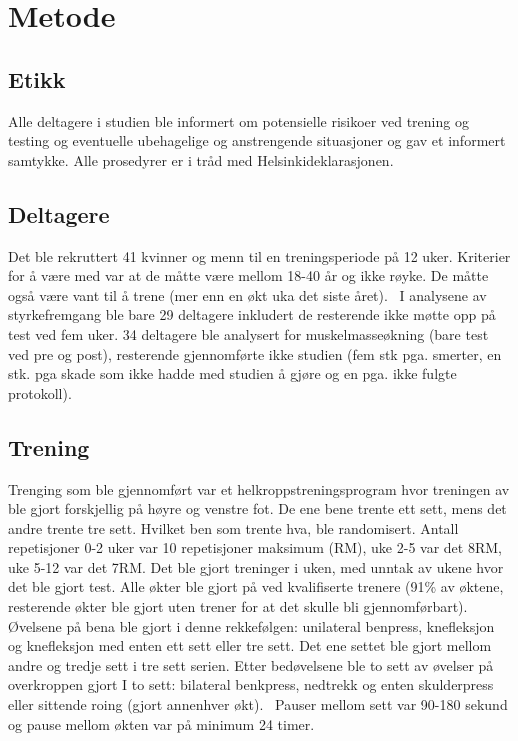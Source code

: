 \documentclass[
]{book}
\begin{document}
\hypertarget{metode-2}{%
\section{Metode}\label{metode-2}}

\hypertarget{etikk}{%
\subsection{Etikk}\label{etikk}}

Alle deltagere i studien ble informert om potensielle risikoer ved trening og testing og eventuelle ubehagelige og anstrengende situasjoner og gav et informert samtykke. Alle prosedyrer er i tråd med Helsinkideklarasjonen.

\hypertarget{deltagere}{%
\subsection{Deltagere}\label{deltagere}}

Det ble rekruttert 41 kvinner og menn til en treningsperiode på 12 uker. Kriterier for å være med var at de måtte være mellom 18-40 år og ikke røyke. De måtte også være vant til å trene (mer enn en økt uka det siste året). ~I analysene av styrkefremgang ble bare 29 deltagere inkludert de resterende ikke møtte opp på test ved fem uker. 34 deltagere ble analysert for muskelmasseøkning (bare test ved pre og post), resterende gjennomførte ikke studien (fem stk pga. smerter, en stk. pga skade som ikke hadde med studien å gjøre og en pga. ikke fulgte protokoll).

\hypertarget{trening}{%
\subsection{Trening}\label{trening}}

Trenging som ble gjennomført var et helkroppstreningsprogram hvor treningen av ble gjort forskjellig på høyre og venstre fot. De ene bene trente ett sett, mens det andre trente tre sett. Hvilket ben som trente hva, ble randomisert. Antall repetisjoner 0-2 uker var 10 repetisjoner maksimum (RM), uke 2-5 var det 8RM, uke 5-12 var det 7RM. Det ble gjort treninger i uken, med unntak av ukene hvor det ble gjort test. Alle økter ble gjort på ved kvalifiserte trenere (91\% av øktene, resterende økter ble gjort uten trener for at det skulle bli gjennomførbart). Øvelsene på bena ble gjort i denne rekkefølgen: unilateral benpress, knefleksjon og knefleksjon med enten ett sett eller tre sett. Det ene settet ble gjort mellom andre og tredje sett i tre sett serien. Etter bedøvelsene ble to sett av øvelser på overkroppen gjort I to sett: bilateral benkpress, nedtrekk og enten skulderpress eller sittende roing (gjort annenhver økt).~ Pauser mellom sett var 90-180 sekund og pause mellom økten var på minimum 24 timer.
\end{document}
